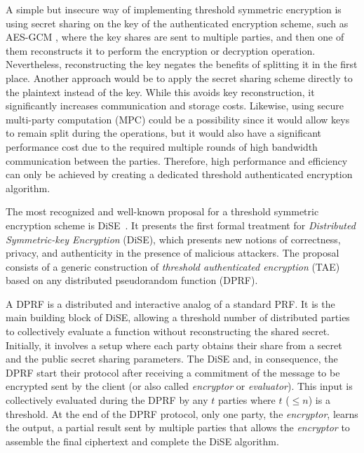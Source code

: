 A simple but insecure way of implementing threshold symmetric encryption is using secret sharing on the key of the authenticated encryption scheme, such as AES-GCM \cite{aesgcm}, where the key shares are sent to multiple parties, and then one of them reconstructs it to perform the encryption or decryption operation. Nevertheless, reconstructing the key negates the benefits of splitting it in the first place. Another approach would be to apply the secret sharing scheme directly to the plaintext instead of the key. While this avoids key reconstruction, it significantly increases communication and storage costs. Likewise, using secure multi-party computation (MPC) could be a possibility since it would allow keys to remain split during the operations, but it would also have a significant performance cost due to the required multiple rounds of high bandwidth communication between the parties. Therefore, high performance and efficiency can only be achieved by creating a dedicated threshold authenticated encryption algorithm.

The most recognized and well-known proposal for a threshold symmetric encryption scheme is DiSE~\cite{dise}. It presents the first formal treatment for \textit{Distributed Symmetric-key Encryption} (DiSE), which presents new notions of correctness, privacy, and authenticity in the presence of malicious attackers. The proposal consists of a generic construction of \textit{threshold authenticated encryption} (TAE) based on any distributed pseudorandom function (DPRF).

A DPRF is a distributed and interactive analog of a standard PRF. It is the main building block of DiSE, allowing a threshold number of distributed parties to collectively evaluate a function without reconstructing the shared secret. Initially, it involves a setup where each party obtains their share from a secret and the public secret sharing parameters. The DiSE and, in consequence, the DPRF start their protocol after receiving a commitment of the message to be encrypted sent by the client (or also called \textit{encryptor} or \textit{evaluator}). This input is collectively evaluated during the DPRF by any $t$ parties where $t$ ($\le n$) is a threshold. At the end of the DPRF protocol, only one party, the \textit{encryptor}, learns the output, a partial result sent by multiple parties that allows the \textit{encryptor} to assemble the final ciphertext and complete the DiSE algorithm. 

